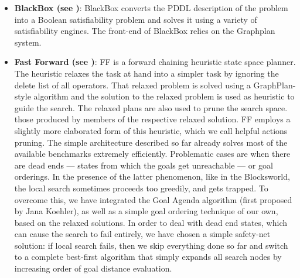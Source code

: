 \documentclass[12pt]{article}
\begin{document}
\begin{enumerate}
    \begin{itemize}
      \item \textbf{BlackBox (see \cite{Blackbox})}: BlackBox converts the PDDL description of the problem into a Boolean satisfiability problem and solves it using a variety of satisfiability engines. The front-end of BlackBox relies on the Graphplan system.
      \item \textbf{Fast Forward (see \cite{FastForward})}: FF is a forward chaining heuristic state space planner. The heuristic relaxes the task at hand into a simpler task by ignoring the delete list of all operators. That relaxed problem is solved using a GraphPlan-style algorithm and the solution to the relaxed problem is used as heuristic to guide the search. The relaxed plans are also used to prune the search space.
those produced by members of the respective relaxed solution. FF employs a slightly more elaborated form of this heuristic, which we call helpful actions pruning. The simple architecture described so far already solves most of the available benchmarks extremely efficiently. Problematic cases are when there are dead ends --- states from which the goals get unreachable --- or goal orderings. In the presence of the latter phenomenon, like in the Blocksworld, the local search sometimes proceeds too greedily, and gets trapped. To overcome this, we have integrated the Goal Agenda algorithm (first proposed by Jana Koehler), as well as a simple goal ordering technique of our own, based on the relaxed solutions. In order to deal with dead end states, which can cause the search to fail entirely, we have chosen a simple safety-net solution: if local search fails, then we skip everything done so far and switch to a complete best-first algorithm that simply expands all search nodes by increasing order of goal distance 
evaluation.
    \end{itemize}
    

\end{enumerate}
\end{document}
